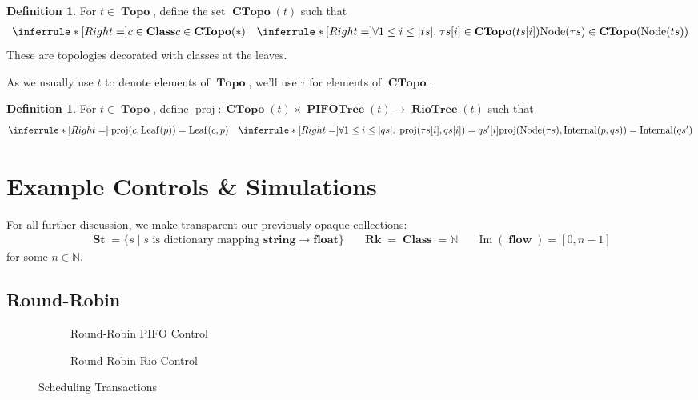\documentclass{amsart}
\DeclareMathOperator{\Ima}{Im}
\newcommand{\inference}[3]{\inferrule*[Right=#1]{#2}{#3}}
\newcommand{\axiom}[2]{\inferrule*[Right=#1]{\;}{#2}}
\DeclareMathOperator{\proj}{\mathrm{proj}}
\DeclareMathOperator{\Rk}{\mathbf{Rk}}
\DeclareMathOperator{\Topo}{\mathbf{Topo}}
\DeclareMathOperator{\PIFOTree}{\mathbf{PIFOTree}}
\DeclareMathOperator{\Leaf}{\mathrm{Leaf}}
\DeclareMathOperator{\Internal}{\mathrm{Internal}}
\DeclareMathOperator{\Node}{\mathrm{Node}}
\DeclareMathOperator{\St}{\mathbf{St}}
\DeclareMathOperator{\Class}{\mathbf{Class}}
\DeclareMathOperator{\flow}{\mathbf{flow}}
\DeclareMathOperator{\CTopo}{\textbf{CTopo}}
\DeclareMathOperator{\RioTree}{\mathbf{RioTree}}
\theoremstyle{definition}
\newtheorem{dfn}[thm]{Definition}
\begin{document}
\begin{dfn}
    For $t \in \Topo$, define the set $\CTopo(t)$ such that
    \begin{align*}
        \inference{}
        {c \in \Class}
        {c \in \CTopo(\ast)}
        &&
        \inference{}
        {\forall 1 \leq i \leq |ts|. \; \tau s[i] \in \CTopo(ts[i])}
        {\Node(\tau s) \in \CTopo(\Node(ts))}
    \end{align*}
    These are topologies decorated with classes at the leaves.
\end{dfn}

As we usually use $t$ to denote elements of $\Topo$, we'll use $\tau$ for elements of $\CTopo$.

\begin{dfn}
    For $t \in \Topo$, define $\proj: \CTopo(t) \times \PIFOTree(t) \to \RioTree(t)$ such that
    \begin{align*}
        \axiom{}
        {\proj(c, \Leaf(p)) = \Leaf(c, p)}
        &&
        \inference{}
        {\forall 1 \leq i \leq |qs|. \; \proj(\tau s[i], qs[i]) = qs^\prime[i]}
        {\proj(\Node(\tau s), \Internal(p, qs)) = \Internal(qs^\prime)}
    \end{align*}
\end{dfn}


\newpage

\section{Example Controls \& Simulations}

For all further discussion, we make transparent our previously opaque collections:
\begin{align*}
    \St = \{s \mid s \text{ is dictionary mapping } \textbf{string} \to \textbf{float}\} &&
    \Rk = \Class = \mathbb N &&
    \Ima(\flow) = [0, n - 1]
\end{align*}
for some $n \in \mathbb N$.

\subsection{Round-Robin}

\begin{figure}[!htb]
    \centering
    \begin{subfigure}[t]{0.49\linewidth}
        
        
        \caption{Round-Robin PIFO Control}
        \label{fig:rr-pifo-ctrl}
    \end{subfigure}
    \begin{subfigure}[t]{0.49\linewidth}
        
        
        
        \caption{Round-Robin Rio Control}
        \label{fig:rr-rio-ctrl}
    \end{subfigure}
    \caption{Scheduling Transactions}
    \label{fig:sched_trans}
\end{figure}
\end{document}

